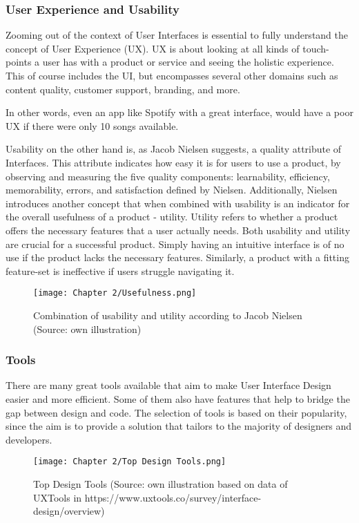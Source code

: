\subsubsection{User Experience and Usability}
Zooming out of the context of User Interfaces is essential to fully understand the concept of User
Experience (UX). UX is about looking at all kinds of touch-points a user has with a product or
service and seeing the holistic experience. This of course includes the UI, but encompasses several
other domains such as content quality, customer support, branding, and more.

In other words, even an app like Spotify with a great interface, would have a poor UX if there were
only 10 songs available.

Usability on the other hand is, as Jacob Nielsen suggests, a quality attribute of Interfaces. This
attribute indicates how easy it is for users to use a product, by observing and measuring the five
quality components: learnability, efficiency, memorability, errors, and satisfaction
defined by Nielsen. Additionally, Nielsen introduces another concept that when combined with
usability is an indicator for the overall usefulness of a product - utility. Utility refers to
whether a product offers the necessary features that a user actually needs. Both usability and
utility are crucial for a successful product. Simply having an intuitive interface is of no use if
the product lacks the necessary features. Similarly, a product with a fitting feature-set is
ineffective if users struggle navigating it.
\begin{figure}[H]
    \centering
    \texttt{[image: Chapter 2/Usefulness.png]}
    \caption{Combination of usability and utility according to Jacob Nielsen (Source: own illustration)}
\end{figure}

\subsubsection{Tools}
There are many great tools available that aim to make User Interface Design easier and more
efficient. Some of them also have features that help to bridge the gap between design and code. The
selection of tools is based on their popularity, since the aim is to provide a solution that
tailors to the majority of designers and developers. %
\begin{figure}[H]
    \centering
    \texttt{[image: Chapter 2/Top Design Tools.png]}
    \caption{Top Design Tools (Source: own illustration based on data of UXTools in https://www.uxtools.co/survey/interface-design/overview)}
\end{figure}

